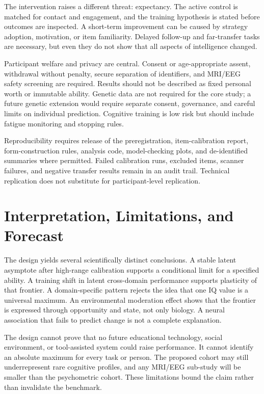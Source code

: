 \documentclass[conference]{IEEEtran}
\begin{document}
The intervention raises a different threat: expectancy. The active control is matched for contact and engagement, and the training hypothesis is stated before outcomes are inspected. A short-term improvement can be caused by strategy adoption, motivation, or item familiarity. Delayed follow-up and far-transfer tasks are necessary, but even they do not show that all aspects of intelligence changed.

Participant welfare and privacy are central. Consent or age-appropriate assent, withdrawal without penalty, secure separation of identifiers, and MRI/EEG safety screening are required. Results should not be described as fixed personal worth or immutable ability. Genetic data are not required for the core study; a future genetic extension would require separate consent, governance, and careful limits on individual prediction. Cognitive training is low risk but should include fatigue monitoring and stopping rules.

Reproducibility requires release of the preregistration, item-calibration report, form-construction rules, analysis code, model-checking plots, and de-identified summaries where permitted. Failed calibration runs, excluded items, scanner failures, and negative transfer results remain in an audit trail. Technical replication does not substitute for participant-level replication.

\section{Interpretation, Limitations, and Forecast}
\label{sec:forecast}
The design yields several scientifically distinct conclusions. A stable latent asymptote after high-range calibration supports a conditional limit for a specified ability. A training shift in latent cross-domain performance supports plasticity of that frontier. A domain-specific pattern rejects the idea that one IQ value is a universal maximum. An environmental moderation effect shows that the frontier is expressed through opportunity and state, not only biology. A neural association that fails to predict change is not a complete explanation.

The design cannot prove that no future educational technology, social environment, or tool-assisted system could raise performance. It cannot identify an absolute maximum for every task or person. The proposed cohort may still underrepresent rare cognitive profiles, and any MRI/EEG sub-study will be smaller than the psychometric cohort. These limitations bound the claim rather than invalidate the benchmark.
\end{document}

